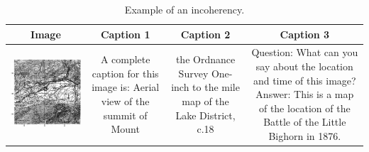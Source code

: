 \begin{table}[ht]
    \centering
    \setlength{\tabcolsep}{5pt}  %
    \begin{tabular}{c|c|c|c}
        \textbf{Image} & \textbf{Caption 1} & \textbf{Caption 2} & \textbf{Caption 3} \\
        \hline
        \begin{minipage}[c]{0.2\linewidth}
            \includegraphics[width=\linewidth]{Images/map5.png}
        \end{minipage} &
        \begin{minipage}[c]{0.2\linewidth}
            A complete caption for this image is: Aerial view of the summit of Mount
        \end{minipage} &
        \begin{minipage}[c]{0.2\linewidth}
            the Ordnance Survey One-inch to the mile map of the Lake District, c.18
        \end{minipage} &
        \begin{minipage}[c]{0.3\linewidth}
            Question: What can you say about the location and time of this image? Answer: This is a map of the location of the Battle of the Little Bighorn in 1876.
        \end{minipage} \\
    \end{tabular}
    \caption{Example of an incoherency.}
    \label{tab:coherence}
\end{table}


